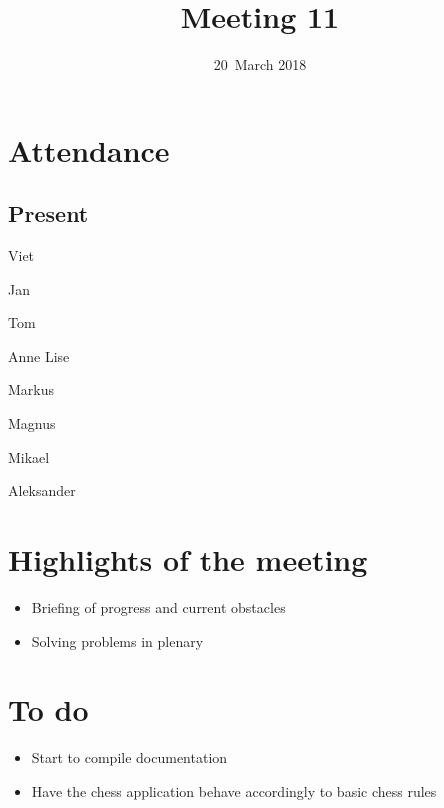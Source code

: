 \documentclass[letterpaper,11pt]{article}
\title{Meeting 11}
\date{20~March 2018}
\begin{document}
\maketitle
\section*{Attendance}
\subsection*{Present}
\begin{list}{}{}
	\item Viet
	\item Jan
	\item Tom
	\item Anne Lise
	\item Markus
	\item Magnus
	\item Mikael
	\item Aleksander
\end{list}

\newpage
\section*{Highlights of the meeting}
\begin{itemize}
	\item Briefing of progress and current obstacles
	\item Solving problems in plenary
\end{itemize}

\section*{To do}
\begin{itemize}
	\item Start to compile documentation
	\item Have the chess application behave accordingly to basic chess rules
\end{itemize}
\end{document}
